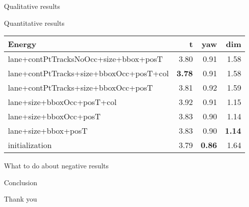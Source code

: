 \begin{frame}{Qualitative results}
\end{frame}

\begin{frame}{Quantitative results}
  \small{
\begin{table}
  \begin{tabular}{lrrr}
    \toprule
    Energy & t & yaw & dim \\
    \midrule
    lane+contPtTracksNoOcc+size+bbox+posT   & 3.80 & 0.91 & 1.58 \\
    lane+contPtTracks+size+bboxOcc+posT+col & \textbf{3.78} & 0.91 & 1.58 \\
    lane+contPtTracks+size+bboxOcc+posT     & 3.81 & 0.92 & 1.59 \\
    lane+size+bboxOcc+posT+col              & 3.92 & 0.91 & 1.15 \\
    lane+size+bboxOcc+posT                  & 3.83 & 0.90 & 1.14 \\
    lane+size+bbox+posT                     & 3.83 & 0.90 & \textbf{1.14} \\
    initialization                          & 3.79 & \textbf{0.86} & 1.64 \\
    \bottomrule
  \end{tabular}
\end{table}
  }

\end{frame}

\begin{frame}{What to do about negative results}
\end{frame}

\begin{frame}{Conclusion}
  
\end{frame}

\begin{frame}{Thank you}
    
\end{frame}

